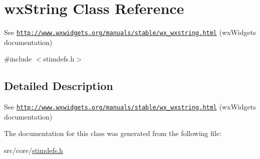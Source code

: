 \hypertarget{classwxString}{
\section{wxString Class Reference}
\label{classwxString}
}


See \href{http://www.wxwidgets.org/manuals/stable/wx_wxstring.html}{\tt http://www.wxwidgets.org/manuals/stable/wx\_\-wxstring.html} (wxWidgets documentation)  




{\ttfamily \#include $<$stimdefs.h$>$}



\subsection{Detailed Description}
See \href{http://www.wxwidgets.org/manuals/stable/wx_wxstring.html}{\tt http://www.wxwidgets.org/manuals/stable/wx\_\-wxstring.html} (wxWidgets documentation) 

The documentation for this class was generated from the following file:\begin{DoxyCompactItemize}
\item 
src/core/\hyperlink{stimdefs_8h}{stimdefs.h}\end{DoxyCompactItemize}
